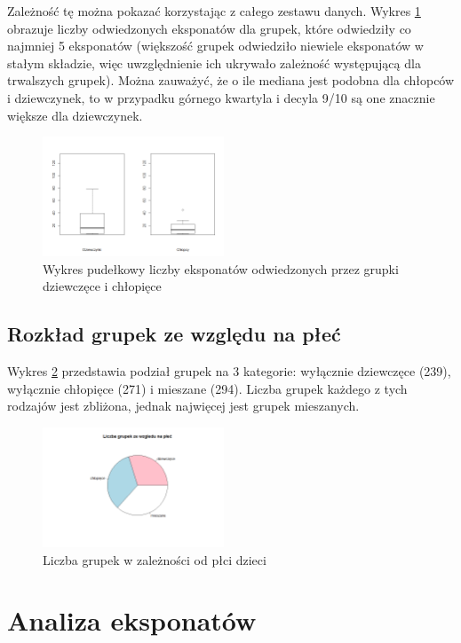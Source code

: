 \documentclass[conference]{IEEEtran}
\begin{document}
Zależność tę można pokazać korzystając z całego zestawu danych. Wykres \ref{grupki_d_c_liczba_eksponatow} obrazuje liczby odwiedzonych eksponatów dla grupek, które odwiedziły co najmniej 5 eksponatów (większość grupek odwiedziło niewiele eksponatów w stałym składzie, więc uwzględnienie ich ukrywało zależność występującą dla trwalszych grupek). Można zauważyć, że o ile mediana jest podobna dla chłopców i dziewczynek, to w przypadku górnego kwartyla i decyla 9/10 są one znacznie większe dla dziewczynek.

\begin{figure}[H]
\includegraphics[width=0.48\textwidth]{grupki_d_c_liczba_eksponatow.png}
\caption{Wykres pudełkowy liczby eksponatów odwiedzonych przez grupki dziewczęce i chłopięce}
\label{grupki_d_c_liczba_eksponatow}
\end{figure}


\subsection{Rozkład grupek ze względu na płeć}
Wykres \ref{grupki_plec} przedstawia podział grupek na 3 kategorie: wyłącznie dziewczęce (239), wyłącznie chłopięce (271) i mieszane (294). Liczba grupek każdego z tych rodzajów jest zbliżona, jednak najwięcej jest grupek mieszanych.

\begin{figure}[H]
\includegraphics[width=0.48\textwidth]{grupki_plec.png}
\caption{Liczba grupek w zależności od płci dzieci}


\label{grupki_plec}
\end{figure}
\section{Analiza eksponatów}
\end{document}
